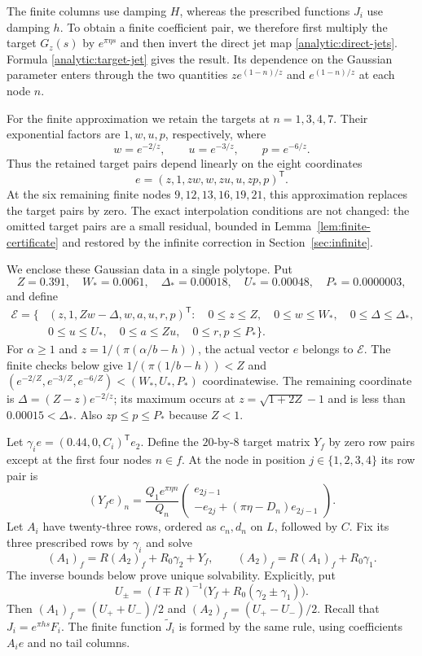 \documentclass[11pt]{article}
\theoremstyle{remark}\newtheorem{remark}[theorem]{Remark}
\begin{document}
The finite columns use damping $H$, whereas the prescribed functions
$J_i$ use damping $h$. To obtain a finite coefficient pair, we therefore
first multiply the target $G_z(s)$ by $e^{\pi\eta s}$ and then invert
the direct jet map \eqref{analytic:direct-jets}. Formula
\eqref{analytic:target-jet} gives the result. Its dependence on the
Gaussian parameter enters through the two quantities
$ze^{(1-n)/z}$ and $e^{(1-n)/z}$ at each node $n$.

For the finite approximation we retain the targets at $n=1,3,4,7$.
Their exponential factors are $1,w,u,p$, respectively, where
\[
 w=e^{-2/z},\qquad u=e^{-3/z},\qquad p=e^{-6/z}.
\]
Thus the retained target pairs depend linearly on the eight coordinates
\[
 e=(z,1,zw,w,zu,u,zp,p)^{\mathsf T}.
\]
At the six remaining finite nodes $9,12,13,16,19,21$, this approximation
replaces the target pairs by zero. The exact interpolation conditions
are not changed: the omitted target pairs are a small residual, bounded
in Lemma~\ref{lem:finite-certificate} and restored by the infinite
correction in Section~\ref{sec:infinite}.

We enclose these Gaussian data in a single polytope. Put
\[
 Z=0.391,\quad W_*=0.0061,\quad \Delta_*=0.00018,
 \quad U_*=0.00048,\quad P_*=0.0000003,
\]
and define
\begin{equation}
 \begin{split}
 \mathcal E=\{&(z,1,Zw-\Delta,w,a,u,r,p)^{\mathsf T}:\quad
 0\leq z\leq Z,\quad0\leq w\leq W_*,\quad
 0\leq\Delta\leq\Delta_*,\\[-2pt]
 &0\leq u\leq U_*,\quad0\leq a\leq Zu,\quad
 0\leq r,p\leq P_*\}.
 \end{split}
 \label{eq:parameter-polytope}
\end{equation}
For $\alpha\geq1$ and $z=1/(\pi(\alpha/b-h))$, the actual vector
$e$ belongs to $\mathcal E$. The finite checks below give
$1/(\pi(1/b-h))<Z$ and
$(e^{-2/Z},e^{-3/Z},e^{-6/Z})<(W_*,U_*,P_*)$ coordinatewise.
The remaining coordinate is $\Delta=(Z-z)e^{-2/z}$; its maximum
occurs at $z=\sqrt{1+2Z}-1$ and is less than $0.00015<\Delta_*$.
Also $zp\leq p\leq P_*$ because $Z<1$.

Let $\gamma_i e=(0.44,0,C_i)^{\mathsf T}e_2$.
Define the $20$-by-$8$ target matrix $Y_f$ by zero row pairs except
at the first four nodes $n\in f$. At the node in position
$j\in\{1,2,3,4\}$ its row pair is
\[
 (Y_fe)_n=\frac{Q_1e^{\pi\eta n}}{Q_n}
 \begin{pmatrix}e_{2j-1}\\-e_{2j}+(\pi\eta-D_n)e_{2j-1}\end{pmatrix}.
\]
Let $A_i$ have twenty-three rows, ordered as $c_n,d_n$ on $L$,
followed by $C$. Fix its three prescribed rows by $\gamma_i$ and solve
\begin{equation}
 (A_1)_f=R(A_2)_f+R_0\gamma_2+Y_f,
 \qquad
 (A_2)_f=R(A_1)_f+R_0\gamma_1.
 \label{eq:finite-system}
\end{equation}
The inverse bounds below prove unique solvability. Explicitly, put
\[
 U_\pm=(I\mp R)^{-1}
          \bigl(Y_f+R_0(\gamma_2\pm\gamma_1)\bigr).
\]
Then $(A_1)_f=(U_++U_-)/2$ and $(A_2)_f=(U_+-U_-)/2$.
Recall that $J_i=e^{\pi hs}F_i$. The finite function $\widetilde J_i$
is formed by the same rule, using coefficients $A_ie$ and no tail columns.
\end{document}
